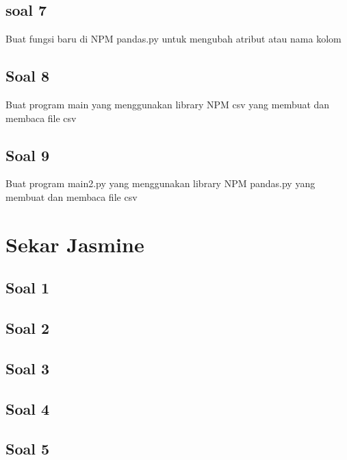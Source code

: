 \subsection{soal 7}
Buat fungsi baru di NPM pandas.py untuk mengubah atribut atau nama kolom


\subsection{Soal 8}
Buat program main yang menggunakan library NPM csv yang membuat dan membaca file csv


\subsection{Soal 9}
Buat program main2.py yang menggunakan library NPM pandas.py yang membuat dan membaca file csv






\section{Sekar Jasmine}
\subsection{Soal 1}

\subsection{Soal 2}

\subsection{Soal 3}

\subsection{Soal 4}

\subsection{Soal 5}

